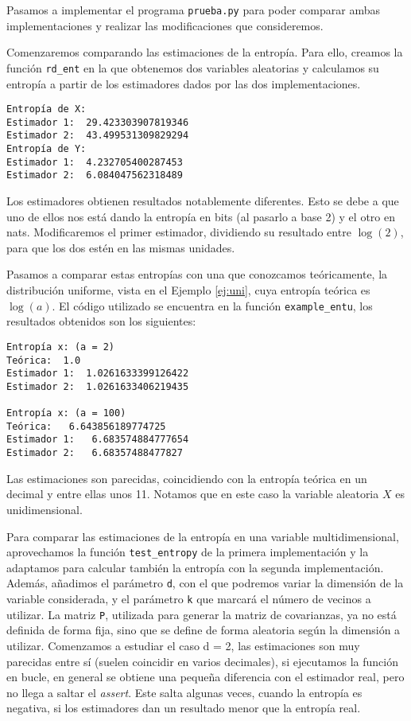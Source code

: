 \documentclass[12pt,a4paper]{report} %
\theoremstyle{definition}
\begin{document}
Pasamos a implementar el programa \texttt{prueba.py} para poder comparar ambas implementaciones y realizar las modificaciones que consideremos.

Comenzaremos comparando las estimaciones de la entropía. Para ello, creamos la función \texttt{rd\_ent} en la que obtenemos dos variables aleatorias y calculamos su entropía a partir de los estimadores dados por las dos implementaciones.

\begin{lstlisting}
Entropía de X:
Estimador 1:  29.423303907819346
Estimador 2:  43.499531309829294
Entropía de Y:
Estimador 1:  4.232705400287453
Estimador 2:  6.084047562318489
\end{lstlisting}

Los estimadores obtienen resultados notablemente diferentes. Esto se debe a que uno de ellos nos está dando la entropía en bits (al pasarlo a base 2) y el otro en nats. Modificaremos el primer estimador, dividiendo su resultado entre $\log(2)$, para que los dos estén en las mismas unidades.

Pasamos a comparar estas entropías con una que conozcamos teóricamente, la distribución uniforme, vista en el Ejemplo \ref{ej:uni}, cuya entropía teórica es $\log(a)$. El código utilizado se encuentra en la función \texttt{example\_entu}, los resultados obtenidos son los siguientes:

\begin{lstlisting}
Entropía x: (a = 2)
Teórica:  1.0
Estimador 1:  1.0261633399126422
Estimador 2:  1.0261633406219435

Entropía x: (a = 100)
Teórica:   6.643856189774725
Estimador 1:   6.683574884777654
Estimador 2:   6.68357488477827
\end{lstlisting}

Las estimaciones son parecidas, coincidiendo con la entropía teórica en un decimal y entre ellas unos 11. Notamos que en este caso la variable aleatoria $X$ es unidimensional.

Para comparar las estimaciones de la entropía en una variable multidimensional, aprovechamos la función \texttt{test\_entropy} de la primera implementación y la adaptamos para calcular también la entropía con la segunda implementación. Además, añadimos el parámetro \texttt{d}, con el que podremos variar la dimensión de la variable considerada, y el parámetro \texttt{k} que marcará el número de vecinos a utilizar. La matriz \texttt{P}, utilizada para generar la matriz de covarianzas, ya no está definida de forma fija, sino que se define de forma aleatoria según la dimensión a utilizar. Comenzamos a estudiar el caso d = 2, las estimaciones son muy parecidas entre sí (suelen coincidir en varios decimales), si ejecutamos la función en bucle, en general se obtiene una pequeña diferencia con el estimador real, pero no llega a saltar el \textit{assert}. Este salta algunas veces, cuando la entropía es negativa, si los estimadores dan un resultado menor que la entropía real.
\end{document}
